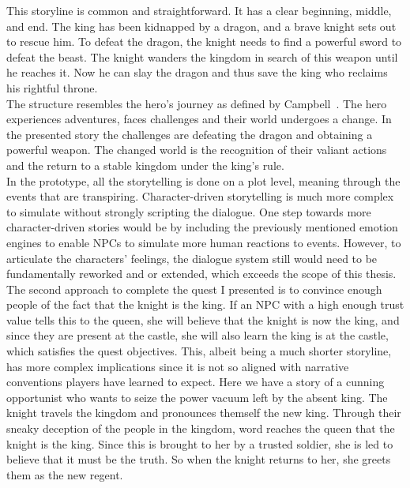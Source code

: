This storyline is common and straightforward. It has a clear beginning, middle, and end. The king has been kidnapped by a dragon, and a brave knight sets out to rescue him. To defeat the dragon, the knight needs to find a powerful sword to defeat the beast. The knight wanders the kingdom in search of this weapon until he reaches it. Now he can slay the dragon and thus save the king who reclaims his rightful throne.\\
The structure resembles the hero's journey as defined by Campbell~\cite{Campbell2008}. The hero experiences adventures, faces challenges and their world undergoes a change. In the presented story the challenges are defeating the dragon and obtaining a powerful weapon. The changed world is the recognition of their valiant actions and the return to a stable kingdom under the king's rule.\\
In the prototype, all the storytelling is done on a plot level, meaning through the events that are transpiring. Character-driven storytelling is much more complex to simulate without strongly scripting the dialogue. One step towards more character-driven stories would be by including the previously mentioned emotion engines to enable NPCs to simulate more human reactions to events. However, to articulate the characters’ feelings, the dialogue system still would need to be fundamentally reworked and or extended, which exceeds the scope of this thesis.\\
The second approach to complete the quest I presented is to convince enough people of the fact that the knight is the king. If an NPC with a high enough trust value tells this to the queen, she will believe that the knight is now the king, and since they are present at the castle, she will also learn the king is at the castle, which satisfies the quest objectives. This, albeit being a much shorter storyline, has more complex implications since it is not so aligned with narrative conventions players have learned to expect. Here we have a story of a cunning opportunist who wants to seize the power vacuum left by the absent king. The knight travels the kingdom and pronounces themself the new king. Through their sneaky deception of the people in the kingdom, word reaches the queen that the knight is the king. Since this is brought to her by a trusted soldier, she is led to believe that it must be the truth. So when the knight returns to her, she greets them as the new regent.\\
